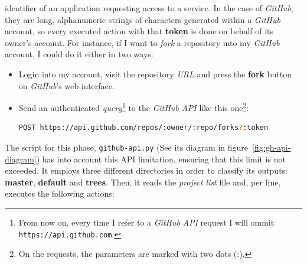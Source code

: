 \documentclass[a4paper, 12pt]{book}
\begin{document}
identifier of an application requesting access to a service.
In the case of \emph{GitHub}, they are long, alphanumeric strings of characters generated within a \emph{GitHub} account,
so every executed action with that \textbf{token} is done on behalf of its owner's account.
For instance, if I want to \textit{fork} a repository into my \emph{GitHub} account, I could do it either in two ways:
\begin{itemize}
  \item Login into my account, visit the repository \emph{URL} and press the \textbf{fork} button on \emph{GitHub}'s web interface.
  \item Send an authenticated \textit{query}\footnote{From now on, every time I refer to a \emph{GitHub} \textit{API}
  request I will ommit \texttt{https://api.github.com}.}
  to the \emph{GitHub} \textit{API} like this one\footnote{On the requests, the parameters are marked with two dots (:).}:
  \begin{lstlisting}[language=bash]
  POST https://api.github.com/repos/:owner/:repo/forks?:token \end{lstlisting}
\end{itemize}
The script for this phase, \texttt{github-api.py} (See its diagram in figure~\ref{fig:gh-api-diagram}) has into account
this API limitation, ensuring that this limit is not exceeded. It employs three different directories in order to classify its outputs:
\textbf{master}, \textbf{default} and \textbf{trees}.
Then, it reads the \emph{project list} file and, per line, executes the following actions:
\end{document}
